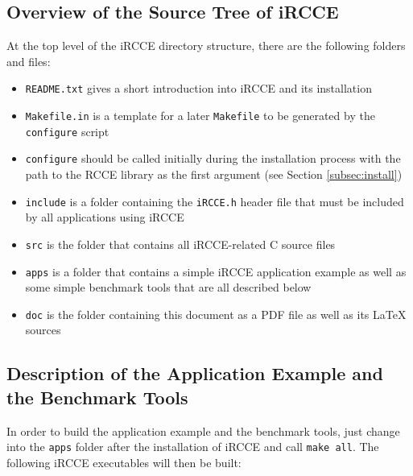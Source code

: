 \documentclass[fontsize=10pt, paper=a4, DIV12, pagesize=auto]{scrartcl}
\begin{document}
\subsection{Overview of the Source Tree of iRCCE}\label{sec:sourcetree}

At the top level of the iRCCE directory structure, there are the following folders and files:

\begin{itemize}
	\item \texttt{README.txt} gives a short introduction into iRCCE and its installation
	\item \texttt{Makefile.in} is a template for a later \texttt{Makefile} to be generated by the \texttt{configure} script
	\item \texttt{configure} should be called initially during the installation process with the path to the RCCE library as the first argument (see Section \ref{subsec:install})
	\item \texttt{include} is a folder containing the \texttt{iRCCE.h} header file that must be included by all applications using iRCCE
	\item \texttt{src} is the folder that contains all iRCCE-related C source files
	\item \texttt{apps} is a folder that contains a simple iRCCE application example as well as some simple benchmark tools that are all described below
	\item \texttt{doc} is the folder containing this document as a PDF file as well as its \LaTeX\/ sources
\end{itemize}


\subsection{Description of the Application Example and the Benchmark Tools}\label{sec:applications}

In order to build the application example and the benchmark tools, just change into the \texttt{apps} folder after the installation of iRCCE and call \texttt{make all}.
The following iRCCE executables will then be built:
\end{document}
